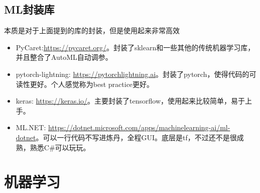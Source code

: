 \documentclass[lang=cn,11pt,a4paper]{eleganttemplate}
\begin{document}
\subsection{ML封装库}
本质是对于上面提到的库的封装，但是使用起来非常高效
\begin{itemize}
    \item PyCaret:\href{https://pycaret.org/}{https://pycaret.org/}。封装了sklearn和一些其他的传统机器学习库，并且整合了AutoML自动调参。
    \item pytorch-lightning: \href{https://pytorchlightning.ai}{https://pytorchlightning.ai}。封装了pytorch，使得代码的可读性更好。个人感觉称为best practice更好。
    \item keras: \href{https://keras.io/}{https://keras.io/}。主要封装了tensorflow，使用起来比较简单，易于上手。
    \item ML.NET: 
    \href{https://dotnet.microsoft.com/apps/machinelearning-ai/ml-dotnet}{https://dotnet.microsoft.com/apps/machinelearning-ai/ml-dotnet}。可以一行代码不写进炼丹，全程GUI。底层是tf，不过还不是很成熟，熟悉C\#可以玩玩。
\end{itemize}

\section{机器学习}
\end{document}
